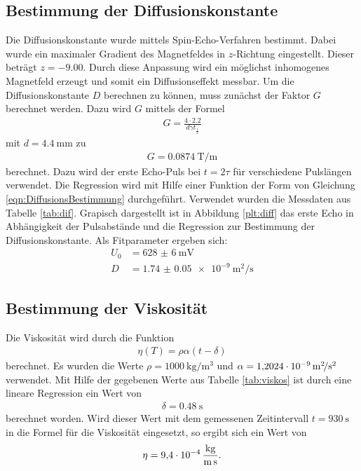 \subsection{Bestimmung der Diffusionskonstante}
Die Diffusionskonstante wurde mittels Spin-Echo-Verfahren bestimmt. Dabei wurde
ein maximaler Gradient des Magnetfeldes in $z$-Richtung eingestellt. Dieser beträgt
$z = -\num{9.00}$. Durch diese Anpassung wird ein möglichst inhomogenes Magnetfeld
erzeugt und somit ein Diffusionseffekt messbar.
Um die Diffusionskonstante $D$ berechnen zu können, muss zunächst der Faktor
$G$ berechnet werden. Dazu wird $G$ mittels der Formel
\begin{align*}
  G = \frac{4\cdot 2.2}{d \gamma t_\frac{1}{2}}
\end{align*}
mit $d = \SI{4.4}{\milli\meter}$ zu
\begin{align*}
  G = \SI{0.0874}{\tesla\per\meter}
\end{align*}
berechnet.
Dazu wird der erste Echo-Puls bei $t = 2\tau$ für verschiedene Pulslängen
verwendet. Die Regression wird mit Hilfe
einer Funktion der Form von Gleichung \eqref{eqn:DiffusionsBestimmung} durchgeführt. Verwendet wurden die
Messdaten aus Tabelle \ref{tab:dif}.
%
Grapisch dargestellt ist in Abbildung
\ref{plt:diff} das erste Echo in Abhängigkeit der Pulsabstände und die Regression
zur Bestimmung der Diffusionskonstante.
Als Fitparameter ergeben sich:
\begin{align*}
  U_0 &= \SI{628(6)}{\milli\volt} \\
  D &= \SI{1.74(5)e-9}{\square\meter\per\second}
\end{align*}

\subsection{Bestimmung der Viskosität}
Die Viskosität wird durch die Funktion
\begin{align*}
  \eta(T) = \rho \alpha \left(t - \delta\right)
\end{align*}
%
berechnet. Es wurden die Werte $\rho = \SI{1000}{\kilo\gram\per\cubic\meter}$
und $\alpha = \SI{1.2024d-9}{\square\meter\per\square\second}$ verwendet. Mit
Hilfe der gegebenen Werte aus Tabelle \ref{tab:viskos} ist durch eine lineare
Regression ein Wert von
\begin{align*}
  \delta = \SI{0.48}{\second}
\end{align*}
berechnet worden. Wird dieser Wert mit dem gemessenen Zeitintervall
$t = \SI{930}{\second}$ in die Formel für die Viskosität eingesetzt,
so ergibt sich ein Wert von
\begin{align*}
  \eta = \SI{9.4d-4}{\kilo\gram\per\meter\per\second}.
\end{align*}

